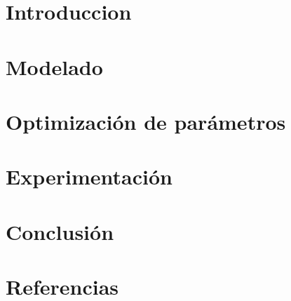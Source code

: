 \documentclass[a4paper]{article}
\begin{document}
\maketitle

\tableofcontents
\newpage

\section{Introduccion}


\section{Modelado}


\section{Optimización de parámetros}




\section{Experimentación}


\section{Conclusión}


\section{Referencias}

\end{document}
